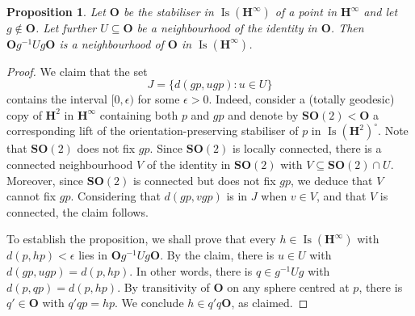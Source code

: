 \documentclass[11pt]{article}
\newtheorem{prop}[theo]{Proposition}
\theoremstyle{definition}
\numberwithin{equation}{section}
\numberwithin{figure}{section}
\numberwithin{table}{section}
\newcommand{\HH}{\mathbf{H}}
\newcommand{\HHI}{\mathbf{H}^{\infty}}
\newcommand{\SO}{\mathbf{SO}}
\newcommand{\OO}{{\mathbf O}}
\newcommand{\Isomi}{{\Isom}(\HHI)}
\DeclareMathOperator{\Isom}{Is}
\newcommand{\se}{\subseteq}
\newcommand{\inv}{^{-1}}
\begin{document}
\begin{prop}\label{prop:auto}
Let $\OO$ be the stabiliser in $\Isomi$ of a point in $\HHI$ and let $g\notin\OO$. Let further $U\se \OO$ be a neighbourhood of the identity in $\OO$. Then $\OO g\inv U g \OO$ is a neighbourhood of $\OO$ in $\Isomi$.
\end{prop}

\begin{proof}
We claim that the set
\[
J=\big\{ d(g p, u g p) : u\in U \big\}
\]
contains the interval $[0, \epsilon)$ for some $\epsilon>0$. Indeed, consider a (totally geodesic) copy of $\HH^2$ in $\HHI$ containing both $p$ and $g p$ and denote by $\SO(2)< \OO$ a corresponding lift of the orientation-preserving stabiliser of $p$ in $\Isom(\HH^2)^\circ$. Note that $\SO(2)$ does not fix $gp$. Since $\SO(2)$ is locally connected, there is a connected neighbourhood $V$ of the identity in $\SO(2)$ with $V\se \SO(2)\cap U$. Moreover, since $\SO(2)$ is connected but does not fix $g p$, we deduce that $V$ cannot fix $g p$. Considering that $d(g p, v g p)$ is in $J$ when $v\in V$, and that $V$ is connected, the claim follows.

To establish the proposition, we shall prove that every $h\in\Isomi$ with $d(p, h p)<\epsilon$ lies in $\OO g\inv U g \OO$. By the claim, there is $u\in U$ with $d(g p, u g p)= d(p, h p)$. In other words, there is $q\in g\inv U g$ with $d(p, q p) = d(p, h p)$. By transitivity of $\OO$ on any sphere centred at $p$, there is $q'\in\OO$ with $q' q p = hp$. We conclude $h\in q' q\OO$, as claimed.
\end{proof}
\end{document}
